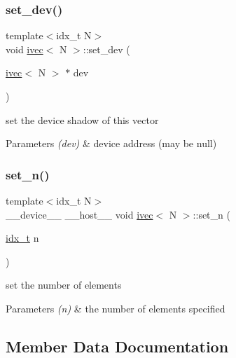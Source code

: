 \subsubsection{\texorpdfstring{set\+\_\+dev()}{set\_dev()}}
{\footnotesize\ttfamily template$<$idx\+\_\+t N$>$ \\
void \hyperlink{structivec}{ivec}$<$ N $>$\+::set\+\_\+dev (\begin{DoxyParamCaption}\item[{\hyperlink{structivec}{ivec}$<$ N $>$ $\ast$}]{dev }\end{DoxyParamCaption})\hspace{0.3cm}{\ttfamily [inline]}}



set the device shadow of this vector 


\begin{DoxyParams}{Parameters}
{\em (dev)} & device address (may be null) \\
\hline
\end{DoxyParams}
\mbox{\label{structivec_a7bbd67af13e22712f34a954e45f7ab81}} 
\subsubsection{\texorpdfstring{set\+\_\+n()}{set\_n()}}
{\footnotesize\ttfamily template$<$idx\+\_\+t N$>$ \\
\+\_\+\+\_\+device\+\_\+\+\_\+ \+\_\+\+\_\+host\+\_\+\+\_\+ void \hyperlink{structivec}{ivec}$<$ N $>$\+::set\+\_\+n (\begin{DoxyParamCaption}\item[{\hyperlink{vgg__util_8h_a8e93478a00e685bea5e6a3f617bf03a3}{idx\+\_\+t}}]{n }\end{DoxyParamCaption})\hspace{0.3cm}{\ttfamily [inline]}}



set the number of elements 


\begin{DoxyParams}{Parameters}
{\em (n)} & the number of elements specified \\
\hline
\end{DoxyParams}


\subsection{Member Data Documentation}
\mbox{\label{structivec_ac50ca2c5bec8b1fd9e84fb8cba681ed6}} 
